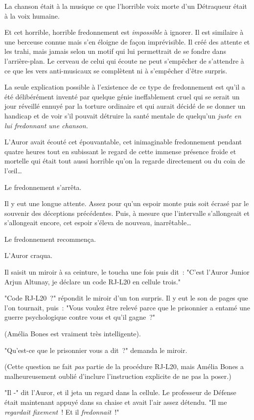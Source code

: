 La chanson était à la musique ce que l'horrible voix morte d'un Détraqueur était à la voix humaine.

Et cet horrible, horrible fredonnement est \emph{impossible} à ignorer. Il est similaire à une berceuse connue mais s'en éloigne de façon imprévisible. Il créé des attente et les trahi, mais jamais selon un motif qui lui permettrait de se fondre dans l'arrière-plan. Le cerveau de celui qui écoute ne peut s'empêcher de s'attendre à ce que les vers anti-musicaux se complètent ni à s'empêcher d'être surpris.

La seule explication possible à l'existence de ce type de fredonnement est qu'il a été délibérément inventé par quelque génie ineffablement cruel qui se serait un jour réveillé ennuyé par la torture ordinaire et qui aurait décidé de se donner un handicap et de voir s'il pouvait détruire la santé mentale de quelqu'un \emph{juste en lui fredonnant une chanson.}

L'Auror avait écouté cet épouvantable, cet inimaginable fredonnement pendant quatre heures tout en subissant le regard de cette immense présence froide et mortelle qui était tout aussi horrible qu'on la regarde directement ou du coin de l'œil…

Le fredonnement s'arrêta.

Il y eut une longue attente. Assez pour qu'un espoir monte puis soit écrasé par le souvenir des déceptions précédentes. Puis, à mesure que l'intervalle s'allongeait et s'allongeait encore, cet espoir s'éleva de nouveau, inarrêtable…

Le fredonnement recommença.

L'Auror craqua.

Il saisit un miroir à sa ceinture, le toucha une fois puis dit~: "C'est l'Auror Junior Arjun Altunay, je déclare un code RJ-L20 en cellule trois."

"Code RJ-L20~?" répondit le miroir d'un ton surpris. Il y eut le son de pages que l'on tournait, puis~: "Vous voulez être relevé parce que le prisonnier a entamé une guerre psychologique contre vous et qu'il gagne~?"

(Amélia Bones est vraiment très intelligente).

"Qu'est-ce que le prisonnier vous a dit~?" demanda le miroir.

(Cette question ne fait \emph{pas} partie de la procédure RJ-L20, mais Amélia Bones a malheureusement oublié d'inclure l'instruction explicite de ne pas la poser.)

"Il -" dit l'Auror, et il jeta un regard dans la cellule. Le professeur de Défense était maintenant appuyé dans sa chaise et avait l'air assez détendu. "Il me \emph{regardait fixement}~! Et il \emph{fredonnait}~!"

